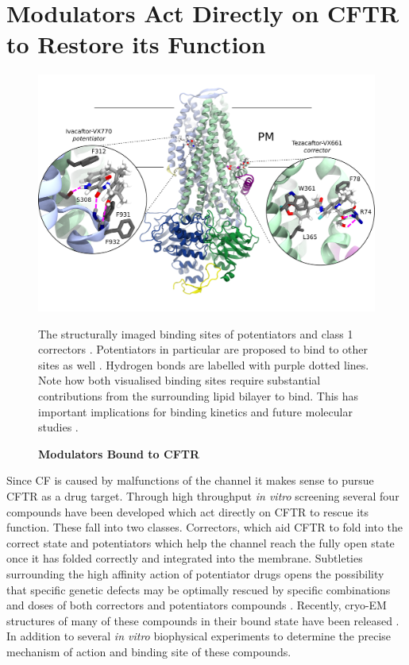 \section{Modulators Act Directly on CFTR to Restore its Function}
\begin{figure}
	\label{drugs_bound}
	\begin{center}
		\includegraphics[width=1\textwidth]{figures/drugs_bound_overall.pdf}
	\end{center}
	\captionsetup{singlelinecheck = false, justification=raggedright}
	\caption[Modulators Bound to CFTR] {\textbf{Modulators Bound to CFTR}}{The structurally imaged binding sites of potentiators and class 1 correctors \cite{liu2019, fiedorczuk2022}. Potentiators in particular are proposed to bind to other sites as well \cite{yeh2019, liu2019}. Hydrogen bonds are labelled with purple dotted lines. Note how both visualised binding sites require substantial contributions from the surrounding lipid bilayer to bind. This has important implications for binding kinetics and future molecular studies \cite{csanady2019}.}
\end{figure}
Since CF is caused by malfunctions of the channel it makes sense to pursue CFTR as a drug target. Through high throughput \textit{in vitro} screening several four compounds have been developed which act directly on CFTR to rescue its function. These fall into two classes. Correctors, which aid CFTR to fold into the correct state and potentiators which help the channel reach the fully open state once it has folded correctly and integrated into the membrane. Subtleties surrounding the high affinity action of potentiator drugs opens the possibility that specific genetic defects may be optimally rescued by specific combinations and doses of both correctors and potentiators compounds \cite{csanady2019}. Recently, cryo-EM structures of many of these compounds in their bound state have been released \cite{liu2019, fiedorczuk2022}. In addition to several \textit {in vitro} biophysical experiments to determine the precise mechanism of action and binding site of these compounds.

